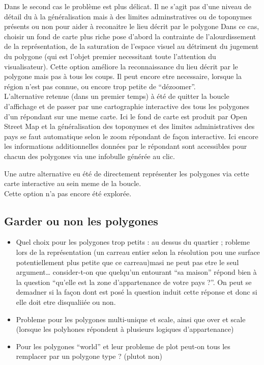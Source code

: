 \documentclass[
  a4paper,
]{scrbook}
\begin{document}
Dans le second cas le problème est plus délicat. Il ne s'agit pas d'une
niveau de détail du à la généralisation mais à des limites
adminstratives ou de toponymes présents ou non pour aider à reconaitre
le lieu décrit par le polygone Dans ce cas, choisir un fond de carte
plus riche pose d'abord la contrainte de l'alourdissement de la
représentation, de la saturation de l'espace visuel au détriment du
jugement du polygone (qui est l'objet premier necessitant toute
l'attention du visualisateur). Cette option améliore la reconnaissance
du lieu décrit par le polygone mais pas à tous les coups. Il peut encore
etre necessaire, lorsque la région n'est pas connue, ou encore trop
petite de ``dézoomer''.\\
L'alternative retenue (dans un premier temps) à été de quitter la boucle
d'affichage et de passer par une cartographie interactive des tous les
polygones d'un répondant sur une meme carte. Ici le fond de carte est
produit par Open Street Map et la généralisation des toponymes et des
limites administratives des pays se faut automatique selon le zoom
répondant de façon interactive. Ici encore les informations
additionnelles données par le répondant sont accessibles pour chacun des
polygones via une infobulle générée au clic.

Une autre alternative eu été de directement représenter les polygones
via cette carte interactive au sein meme de la boucle.\\
Cette option n'a pas encore été explorée.

\hypertarget{garder-ou-non-les-polygones}{%
\subsection{Garder ou non les
polygones}\label{garder-ou-non-les-polygones}}

\begin{itemize}
\item
  Quel choix pour les polygones trop petits : au dessus du quartier ;
  robleme lors de la représentation (un carreau entier selon la
  résolution pou une surface potentiellement plus petite que ce
  carreau)masi ne peut pas etre le seul argument\ldots{} consider-t-on
  que quelqu'un entourant ``sa maison'' répond bien à la question
  ``qu'elle est la zone d'appartenance de votre pays ?''. On peut se
  demadner si la façon dont est posé la question induit cette réponse et
  donc si elle doit etre disqualiiée ou non.
\item
  Probleme pour les polygones multi-unique et scale, ainsi que over et
  scale (lorsque les polyhones répondent à plusieurs logiques
  d'appartenance)
\item
  Pour les polygones ``world'' et leur probleme de plot peut-on tous les
  remplacer par un polygone type ? (plutot non)
\end{itemize}
\end{document}

